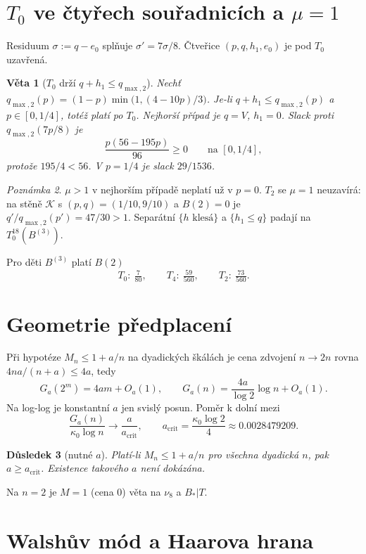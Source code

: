 \documentclass[11pt,a4paper]{article}
\newtheorem{theorem}{Věta}
\newtheorem{corollary}[theorem]{Důsledek}
\theoremstyle{definition}
\theoremstyle{remark}
\newtheorem{remark}[theorem]{Poznámka}
\theoremstyle{plain}
\begin{document}
\section{$T_0$ ve čtyřech souřadnicích a $\mu=1$}

Residuum $\sigma:=q-e_0$ splňuje $\sigma'=7\sigma/8$. Čtveřice
$(p,q,h_1,e_0)$ je pod $T_0$ uzavřená.

\begin{theorem}[$T_0$ drží $q+h_1\le q_{\max,2}$]
Nechť $q_{\max,2}(p)=(1-p)\min\bigl(1,(4-10p)/3\bigr)$.
Je-li $q+h_1\le q_{\max,2}(p)$ a $p\in[0,1/4]$, totéž platí po $T_0$.
Nejhorší případ je $q=V$, $h_1=0$. Slack proti $q_{\max,2}(7p/8)$ je
\[
\frac{p(56-195p)}{96}\ge0
\qquad\text{na }[0,1/4],
\]
protože $195/4<56$. V $p=1/4$ je slack $29/1536$.
\end{theorem}

\begin{remark}
$\mu>1$ v nejhorším případě neplatí už v $p=0$. $T_2$ se $\mu=1$
neuzavírá: na stěně $\mathcal K$ s $(p,q)=(1/10,9/10)$ a $B(2)=0$ je
$q'/q_{\max,2}(p')=47/30>1$. Separátní $\{h\text{ klesá}\}$ a
$\{h_1\le q\}$ padají na $T_0^{18}(B^{(3)})$.
\end{remark}

Pro děti $B^{(3)}$ platí $B(2)$
\[
T_0:\ \tfrac7{80},\qquad
T_4:\ \tfrac{59}{560},\qquad
T_2:\ \tfrac{73}{560}.
\]

\section{Geometrie předplacení}

Při hypotéze $M_n\le 1+a/n$ na dyadických škálách je cena zdvojení
$n\to 2n$ rovna $4na/(n+a)\le 4a$, tedy
\[
G_a(2^m)=4am+O_a(1),\qquad
G_a(n)=\frac{4a}{\log 2}\log n+O_a(1).
\]
Na log-log je konstantní $a$ jen svislý posun. Poměr k dolní mezi
\[
\frac{G_a(n)}{\kappa_0\log n}\to\frac{a}{a_{\mathrm{crit}}},
\qquad
a_{\mathrm{crit}}=\frac{\kappa_0\log 2}{4}\approx 0.0028479209.
\]

\begin{corollary}[nutné $a$]
Platí-li $M_n\le 1+a/n$ pro všechna dyadická $n$, pak
$a\ge a_{\mathrm{crit}}$. Existence takového $a$ není dokázána.
\end{corollary}

Na $n=2$ je $M=1$ (cena $0$) věta na $\nu_8$ a $B_*|T$.

\section{Walshův mód a Haarova hrana}
\end{document}

